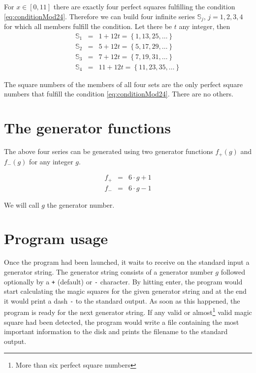 \documentclass[reqno,10pt,a4paper]{article}
\begin{document}
	For $x \in [0, 11]$ there are exactly four perfect squares fulfilling the condition \eqref{eq:conditionMod24}. Therefore we can build four infinite series $\mathbb{S}_j$, $j = 1, 2, 3, 4$ for which all members fulfill the condition. Let there be $t$ any integer, then
	\begin{eqnarray}
		\mathbb{S}_1 &=& 1 + 12 t = \left\{ 1, 13, 25, \ldots \right\} \\
		\mathbb{S}_2 &=& 5 + 12 t = \left\{ 5, 17, 29, \ldots \right\} \\
		\mathbb{S}_3 &=& 7 + 12 t = \left\{ 7, 19, 31, \ldots \right\} \\
		\mathbb{S}_4 &=& 11 + 12 t = \left\{ 11, 23, 35, \ldots \right\}
	\end{eqnarray}
	
	The square numbers of the members of all four sets are the only perfect square numbers that fulfill the condition \eqref{eq:conditionMod24}. There are no others.
	
	
	\section{The generator functions}
	
	The above four series can be generated using two generator functions $f_+(g)$ and $f_-(g)$ for any integer $g$.
	
	\begin{eqnarray}
		f_+ &=& 6 \cdot g + 1 \label{eq:generatorFunctionPlus} \\
		f_- &=& 6 \cdot g - 1 \label{eq:generatorFunctionMinus}
	\end{eqnarray}
	
	We will call $g$ the generator number.
	
	
	\section{Program usage}
	
	Once the program had been launched, it waits to receive on the standard input a generator string. The generator string consists of a generator number $g$ followed optionally by a \verb§+§ (default) or \verb§-§ character. By hitting enter, the program would start calculating the magic squares for the given generator string and at the end it would print a dash \verb§-§ to the standard output. As soon as this happened, the program is ready for the next generator string. If any valid or almost\footnote{More than six perfect square numbers} valid magic square had been detected, the program would write a file containing the most important information to the disk and prints the filename to the standard output.
	
\end{document}
